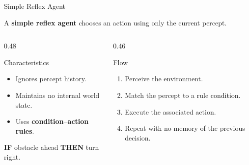 \documentclass[aspectratio=169,10pt]{beamer}
\begin{document}
\begin{frame}{Simple Reflex Agent}
  \begin{cpdefinition}
    A \textbf{simple reflex agent} chooses an action using only the current percept.
  \end{cpdefinition}
  \vspace{0.08in}
  \begin{columns}[T,onlytextwidth]
    \begin{column}{0.48\textwidth}
      \begin{block}{Characteristics}
        \begin{itemize}
          \item Ignores percept history.
          \item Maintains no internal world state.
          \item Uses \textbf{condition--action rules}.
        \end{itemize}
      \end{block}
      \begin{exampleblockcp}
        \textbf{IF} obstacle ahead \textbf{THEN} turn right.
      \end{exampleblockcp}
    \end{column}
    \begin{column}{0.46\textwidth}
      \begin{block}{Flow}
        \begin{enumerate}
          \item Perceive the environment.
          \item Match the percept to a rule condition.
          \item Execute the associated action.
          \item Repeat with no memory of the previous decision.
        \end{enumerate}
      \end{block}
    \end{column}
  \end{columns}
\end{frame}
\end{document}
